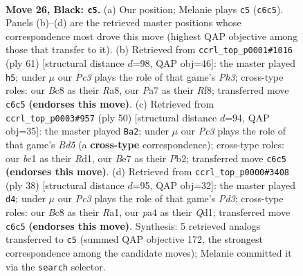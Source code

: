 \documentclass[11pt]{article}
\begin{document}
\clearpage

\begin{figure}[p]\centering
\begin{subfigure}{0.46\textwidth}\centering
\resizebox{\linewidth}{!}{%
\newchessgame
\chessboard[
  setfen={r1b2rk1/p2nb2p/2p5/3q4/Pp1pNP2/1P6/2Q1PK2/RNBR4 b - - 4 26},
  showmover=false,
  pgfstyle=straightmove, color=movearrow, markmove={c6-c5}
]}
\caption{}
\end{subfigure}\hfill
\begin{subfigure}{0.46\textwidth}\centering
\resizebox{\linewidth}{!}{%
\newchessgame
\chessboard[
  setfen={r4r2/1ppq3k/p5bp/3Pp3/PPP1Ppp1/3Q4/4NN1R/1R2K3 b - - 1 31},
  showmover=false,
  pgfstyle=straightmove, color=movearrow, markmove={h6-h5}
]}
\caption{}
\end{subfigure}
\\[4pt]
\begin{subfigure}{0.46\textwidth}\centering
\resizebox{\linewidth}{!}{%
\newchessgame
\chessboard[
  setfen={4k2r/2q1b2p/1n1p1p2/p1nB1P2/1r1B4/4QP2/1PP4P/3R1RK1 w k - 1 26},
  showmover=false,
  pgfstyle=straightmove, color=movearrow, markmove={d5-a2}
]}
\caption{}
\end{subfigure}\hfill
\begin{subfigure}{0.46\textwidth}\centering
\resizebox{\linewidth}{!}{%
\newchessgame
\chessboard[
  setfen={r2q2k1/1pp2pb1/4rnpp/p7/1P2P3/P1BP4/3N1PP1/R2QR1K1 w - - 0 20},
  showmover=false,
  pgfstyle=straightmove, color=movearrow, markmove={d3-d4}
]}
\caption{}
\end{subfigure}
\caption{\textbf{Move 26, Black: \texttt{c5}.} (a) Our position; Melanie plays \texttt{c5} (\texttt{c6c5}). Panels (b)--(d) are the retrieved master positions whose correspondence most drove this move (highest QAP objective among those that transfer to it). (b) Retrieved from \texttt{ccrl\_top\_p0001\#1016} (ply 61) [structural distance $d$=98, QAP obj=46]: the master played \texttt{h5}; under $\mu$ our \emph{Pc3} plays the role of that game's \emph{Ph3}; cross-type roles: our \emph{B}c8 as their \emph{R}a8, our \emph{P}a7 as their \emph{R}f8; transferred move \texttt{c6c5} \textbf{(endorses this move)}. (c) Retrieved from \texttt{ccrl\_top\_p0003\#957} (ply 50) [structural distance $d$=94, QAP obj=35]: the master played \texttt{Ba2}; under $\mu$ our \emph{Pc3} plays the role of that game's \emph{Bd5} (a \textbf{cross-type} correspondence); cross-type roles: our \emph{b}c1 as their \emph{R}d1, our \emph{B}e7 as their \emph{P}b2; transferred move \texttt{c6c5} \textbf{(endorses this move)}. (d) Retrieved from \texttt{ccrl\_top\_p0000\#3408} (ply 38) [structural distance $d$=95, QAP obj=32]: the master played \texttt{d4}; under $\mu$ our \emph{Pc3} plays the role of that game's \emph{Pd3}; cross-type roles: our \emph{B}c8 as their \emph{R}a1, our \emph{p}a4 as their \emph{Q}d1; transferred move \texttt{c6c5} \textbf{(endorses this move)}. Synthesis: 5 retrieved analogs transferred to \texttt{c5} (summed QAP objective 172, the strongest correspondence among the candidate moves); Melanie committed it via the \texttt{search} selector.}
\label{fig:thought-m51}
\end{figure}
\end{document}
